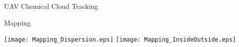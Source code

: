 
\begin{slide}{UAV Chemical Cloud Tracking}
  \centerline{Mapping}
  \vspace{2em}
  \centering
  \texttt{[image: Mapping\_Dispersion.eps]}
  \hspace{5ex}
  \texttt{[image: Mapping\_InsideOutside.eps]}
\end{slide}


%
